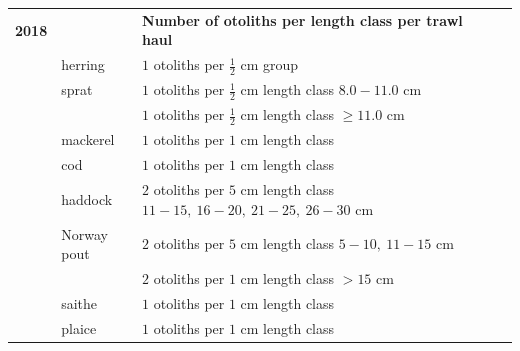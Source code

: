 \documentclass[a4paper 12pt]{article}
\numberwithin{equation}{section}
\begin{document}
\begin{appendices}
\begin{small}
\begin{table}[h!]
\begin{tabularx}{\linewidth}{r l l l l X}
{\bf 2018} & & {\bf Number of otoliths per length class per trawl haul}  \\[1.8ex]
  & herring  &  $1$  otoliths per $\frac{1}{2}$ cm group \\[0.8ex]
     & sprat    & $1$  otoliths per $\frac{1}{2}$ cm length class  $8.0 -11.0$ cm\\[0.8ex]
              & & $1$  otoliths per $\frac{1}{2}$ cm length class  $\geq 11.0$ cm\\[0.8ex]
& mackerel      & $1$  otoliths per $1$ cm length class \\[0.8ex]
& cod       	  & $1$  otoliths per $1$ cm length class\\[0.8ex]
& haddock & $2$  otoliths per $5$ cm length class $11 -15, \ 16-20, \ 21-25, \ 26-30$ cm \\[0.8ex]
& Norway pout & $2$  otoliths per $5$ cm length class $5 -10, \ 11-15$ cm\\[0.8ex]
               & & $2$  otoliths per $1$ cm length class $> 15$ cm\\[1.8ex]
&saithe        & $1$  otoliths per $1$ cm length class \\[0.8ex]  
&plaice       & $1$  otoliths per $1$ cm length class \\[0.5ex]
\bottomrule         
\end{tabularx}
\end{table}
\end{small}


\end{appendices}
\end{document}
